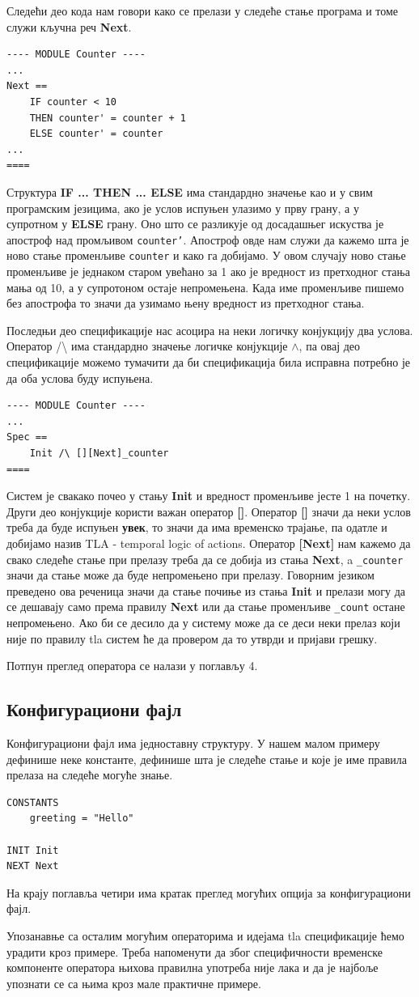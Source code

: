Следећи део кода нам говори како се прелази у следеће стање програма и томе служи кључна реч \textbf{Next}.
\begin{lstlisting}
---- MODULE Counter ----
...
Next ==
    IF counter < 10
    THEN counter' = counter + 1
    ELSE counter' = counter
...
====
\end{lstlisting}
Структура \textbf{IF ... THEN ... ELSE} има стандардно значење као и у свим програмским језицима, ако је услов испуњен
улазимо у прву грану, а у супротном у \textbf{ELSE} грану. Оно што се разликује од досадашњег искуства је апостроф
над промљивом \texttt{counter'}. Апостроф овде нам служи да кажемо шта је ново стање променљиве \texttt{counter} и како га добијамо. У овом случају
ново стање променљиве је једнаком старом увећано за 1 ако је вредност из претходног стања мања од 10, а у супротоном
остаје непромењена. Када име променљиве пишемо без апострофа то значи да узимамо њену вредност из претходног стања.

Последњи део спецификације нас асоцира на неки логичку конјукцију два услова. Оператор /\textbackslash\; има 
стандардно значење логичке конјукције $\wedge $, па овај део спецификације можемо тумачити да би спецификација
била исправна потребно је да оба услова буду испуњена.
\begin{lstlisting}
---- MODULE Counter ----
...
Spec ==
    Init /\ [][Next]_counter
====
\end{lstlisting}
Систем је свакако почео у стању \textbf{Init} и вредност променљиве јесте 1 на почетку. Други део конјукције користи
важан оператор \textbf{[]}. Оператор \textbf{[]} значи да неки услов треба да буде испуњен \textbf{увек}, то значи
да има временско трајање, па одатле и добијамо назив TLA - temporal logic of actions. Оператор \textbf{[Next]} нам кажемо
да свако следеће стање при прелазу треба да се добија из стања \textbf{Next}, a \texttt{\_counter} значи да стање може да буде 
непромењено при прелазу. Говорним језиком преведено ова реченица значи да стање почиње из стања \textbf{Init} и прелази могу да се дешавају
само према правилу \textbf{Next} или да стање променљиве \texttt{\_count} остане непромењено. Ако би се десило да у систему
може да се деси неки прелаз који није по правилу tla систем ће да провером да то утврди и пријави грешку.

Потпун преглед оператора се налази у поглављу 4.

\subsection{Конфигурациони фајл}
Конфигурациони фајл има једноставну структуру. У нашем малом примеру дефинише неке константе, дефинише шта је следеће стање
и које је име правила прелаза на следеће могуће знање. 
\begin{lstlisting}
CONSTANTS
    greeting = "Hello"

INIT Init
NEXT Next
\end{lstlisting}
На крају поглавља четири има кратак преглед могућих опција за конфигурациони фајл. 

Упозанавње са осталим могућим операторима и идејама tla спецификације ћемо урадити кроз примере. Треба напоменути
да због специфичности временске компоненте оператора њихова правилна употреба није лака и да је најбоље
упознати се са њима кроз мале практичне примере.

\newpage